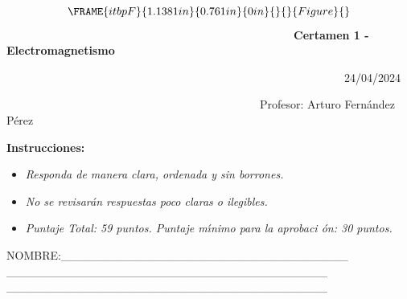 \documentclass{article}
\begin{document}
\begin{equation*}
\FRAME{itbpF}{1.1381in}{0.761in}{0in}{}{}{Figure}{\special{language
"Scientific Word";type "GRAPHIC";maintain-aspect-ratio TRUE;display
"USEDEF";valid_file "T";width 1.1381in;height 0.761in;depth
0in;original-width 1.1044in;original-height 0.729in;cropleft "0";croptop
"1";cropright "1";cropbottom "0";tempfilename
'SCEIF600.wmf';tempfile-properties "XPR";}}
\end{equation*}%
\ \ \ \ \ \ \ \ \ \ \ \ \ \ \ \ \ \ \ \ \ \ \ \ \ \ \ \ \ \ \ \ \ \ \ \ \ \
\ \ \ \ \ \ \ \ \ \ \ \ \ \textbf{Certamen 1 - Electromagnetismo}

\ \ \ \ \ \ \ \ \ \ \ \ \ \ \ \ \ \ \ \ \ \ \ \ \ \ \ \ \ \ \ \ \ \ \ \ \ \
\ \ \ \ \ \ \ \ \ \ \ \ \ \ \ \ \ \ \ \ \ \ 24/04/2024

\noindent\ \ \ \ \ \ \ \ \ \ \ \ \ \ \ \ \ \ \ \ \ \ \ \ \ \ \ \ \ \ \ \ \ \
\ \ \ \ \ \ \ \ \ \ \ Profesor: Arturo Fern\'{a}ndez P\'{e}rez 

\bigskip

\textbf{Instrucciones: }

\begin{itemize}
\item \emph{Responda de manera clara, ordenada y sin borrones. }

\item \emph{No se revisar\'{a}n respuestas poco claras o ilegibles.}

\item \emph{Puntaje Total: 59 puntos. Puntaje m\'{\i}nimo para la aprobaci%
\'{o}n: 30 puntos.}
\end{itemize}

\bigskip 

NOMBRE:\_\_\_\_\_\_\_\_\_\_\_\_\_\_\_\_\_\_\_\_\_\_\_\_\_\_\_\_\_\_\_\_\_\_%
\_\_\_\_\_\_\_\_\_\_\_\_\_\_\_\_\_\_\_\_\_\_\_\_\_\_\_\_\_\_\_\_\_\_\_\_\_\_%
\_\_\_\_\_\_\_\_\_\_\_\_\_\_\_\_\_\_\_\_\_\_\_\_\_\_\_\_\_\_\_\_\_\_\_\_\_\_
\end{document}

